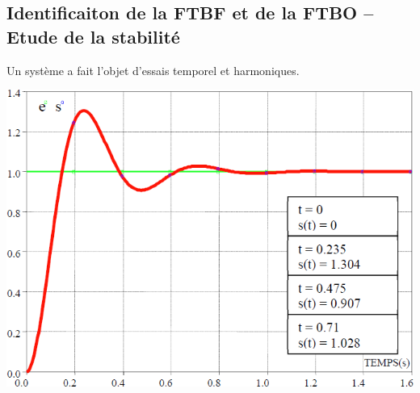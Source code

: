 \documentclass[10pt,fleqn]{article} %
\begin{document}
\def\pathfig{images}

\vspace{6cm}
\pagestyle{fancy}
\thispagestyle{plain}

\def\columnseprulecolor{\color{ocre}}
\setlength{\columnseprule}{0.4pt} 

\def\pathfig{images}

\begin{multicols}{2}
\subsection*{Identificaiton de la FTBF et de la FTBO -- Etude de la stabilité}

Un système a fait l’objet d’essais temporel et harmoniques.
\begin{center}
\includegraphics[width=\linewidth]{images/fig_01}
\end{center}
\begin{center}

\end{center}
\end{multicols}
\end{document}
